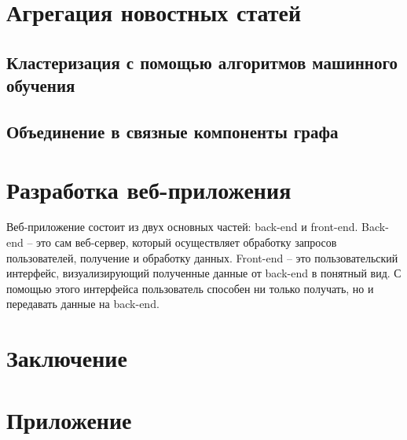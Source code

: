 \documentclass[a4paper, 14pt]{extarticle}
\begin{document}
\section{Агрегация новостных статей}
\subsection{Кластеризация с помощью алгоритмов машинного обучения}
\subsection{Объединение в связные компоненты графа}
\section{Разработка веб-приложения}
Веб-приложение состоит из двух основных частей: back-end и front-end. Back-end -- это сам веб-сервер,
который осуществляет обработку запросов пользователей, получение и обработку данных.
Front-end -- это пользовательский интерфейс, визуализирующий полученные данные от back-end в понятный вид.
С помощью этого интерфейса пользователь способен ни только получать, но и передавать данные на back-end.

\section{Заключение}


\setcounter{secnumdepth}{0}
\section{Приложение}
\end{document}
